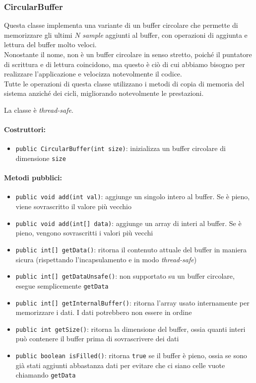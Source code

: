 \subsubsection{CircularBuffer}
Questa classe implementa una variante di un buffer circolare che permette di memorizzare gli ultimi $N$ \textit{sample} aggiunti al buffer, con operazioni di aggiunta e lettura del buffer molto veloci.\\
Nonostante il nome, non è un buffer circolare in senso stretto, poiché il puntatore di scrittura e di lettura coincidono, ma questo è ciò di cui abbiamo bisogno per realizzare l'applicazione e velocizza notevolmente il codice.\\
Tutte le operazioni di questa classe utilizzano i metodi di copia di memoria del sistema anziché dei cicli, migliorando notevolmente le prestazioni.

La classe è \textit{thread-safe}.

\paragraph{Costruttori:}\begin{itemize}
	\item \texttt{public CircularBuffer(int size)}: inizializza un buffer circolare di dimensione \texttt{size}
\end{itemize}

\paragraph{Metodi pubblici:}\begin{itemize}
	\item \texttt{public void add(int val)}: aggiunge un singolo intero al buffer. Se è pieno, viene sovrascritto il valore più vecchio
	\item \texttt{public void add(int[] data)}: aggiunge un array di interi al buffer. Se è pieno, vengono sovrascritti i valori più vecchi
	\item \texttt{public int[] getData()}: ritorna il contenuto attuale del buffer in maniera sicura (rispettando l'incapsulamento e in modo \textit{thread-safe})
	\item \texttt{public int[] getDataUnsafe()}: non supportato su un buffer circolare, esegue semplicemente \texttt{getData}
	\item \texttt{public int[] getInternalBuffer()}: ritorna l'array usato internamente per memorizzare i dati. I dati potrebbero non essere in ordine
	\item \texttt{public int getSize()}: ritorna la dimensione del buffer, ossia quanti interi può contenere il buffer prima di sovrascrivere dei dati
	\item \texttt{public boolean isFilled()}: ritorna \texttt{true} se il buffer è pieno, ossia se sono già stati aggiunti abbastanza dati per evitare che ci siano celle vuote chiamando \texttt{getData}
\end{itemize}

